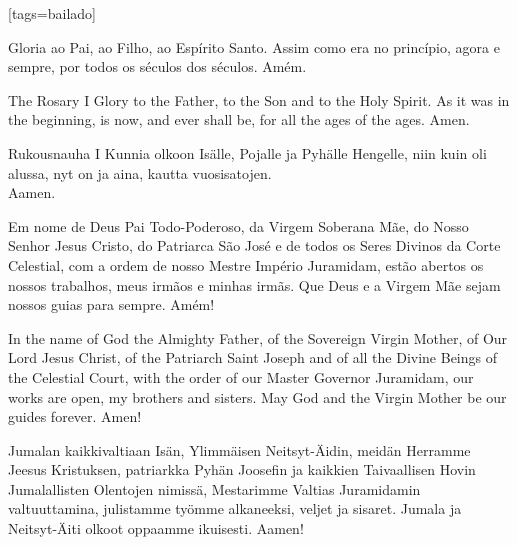 [tags={bailado}]
  \begin{passage}[PT]{}
    Gloria ao Pai, ao Filho, ao Espírito Santo.
    Assim como era no princípio, agora e sempre,
    por todos os séculos dos séculos. Amém.
  \end{passage}
  \begin{passage}[EN]{The Rosary I}
    Glory to the Father, to the Son and to the Holy Spirit.
    As it was in the beginning, is now, and ever shall be,
    for all the ages of the ages. Amen.
  \end{passage}
  \begin{passage}[FI]{Rukousnauha I}
    Kunnia olkoon Isälle, Pojalle ja Pyhälle Hengelle,
    niin kuin oli alussa, nyt on ja aina,
    kautta vuosisatojen.\\
    Aamen.
  \end{passage}
\endsong


\begin{intersong}
  \begin{passage}[PT]{}
    Em nome de Deus Pai Todo-Poderoso, da Virgem Soberana Mãe,
    do Nosso Senhor Jesus Cristo, do Patriarca São José e de
    todos os Seres Divinos da Corte Celestial, com a ordem de
    nosso Mestre Império Juramidam, estão abertos os nossos
    trabalhos, meus irmãos e minhas irmãs. Que Deus e a Virgem Mãe
    sejam nossos guias para sempre. Amém!
  \end{passage}
  \begin{passage}[EN]{ }%
    In the name of God the Almighty Father, of the Sovereign Virgin
    Mother, of Our Lord Jesus Christ, of the Patriarch Saint Joseph and of
    all the Divine Beings of the Celestial Court, with the order of our Master
    Governor Juramidam, our works are open, my brothers and sisters.
    May God and the Virgin Mother be our guides forever. Amen!
  \end{passage}
  \begin{passage}[FI]{ }%
    Jumalan kaikkivaltiaan Isän, Ylimmäisen Neitsyt-Äidin,
    meidän Herramme Jeesus Kristuksen, patriarkka Pyhän Joosefin ja
    kaikkien Taivaallisen Hovin Jumalallisten Olentojen nimissä,
    Mestarimme Valtias Juramidamin valtuuttamina, julistamme työmme alkaneeksi,
    veljet ja sisaret. Jumala ja Neitsyt-Äiti olkoot oppaamme ikuisesti. Aamen!
  \end{passage}
  \vfill
\end{intersong}


